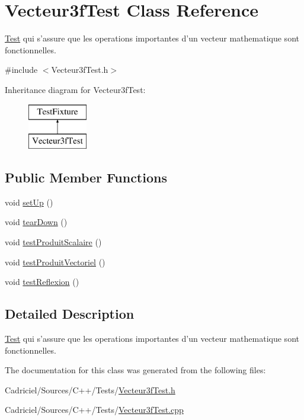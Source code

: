 \hypertarget{class_vecteur3f_test}{\section{Vecteur3f\-Test Class Reference}
\label{class_vecteur3f_test}
}


\hyperlink{class_test}{Test} qui s'assure que les operations importantes d'un vecteur mathematique sont fonctionnelles.  




{\ttfamily \#include $<$Vecteur3f\-Test.\-h$>$}

Inheritance diagram for Vecteur3f\-Test\-:\begin{figure}[H]
\begin{center}
\leavevmode
\includegraphics[height=2.000000cm]{class_vecteur3f_test}
\end{center}
\end{figure}
\subsection*{Public Member Functions}
\begin{DoxyCompactItemize}
\item 
void \hyperlink{group__inf2990_ga52555efbe6a00b29444796fff3f6c1b5}{set\-Up} ()
\item 
void \hyperlink{group__inf2990_gae61f241d05a67bad1fffd292c5ef51b6}{tear\-Down} ()
\item 
void \hyperlink{group__inf2990_gadad2a78f28a7c4791e7bd2d4bb5f3aa8}{test\-Produit\-Scalaire} ()
\item 
void \hyperlink{group__inf2990_ga7061edce110db669267d0d4122e30a50}{test\-Produit\-Vectoriel} ()
\item 
void \hyperlink{group__inf2990_ga56a44d73fe7e58291656778aa1defee9}{test\-Reflexion} ()
\end{DoxyCompactItemize}


\subsection{Detailed Description}
\hyperlink{class_test}{Test} qui s'assure que les operations importantes d'un vecteur mathematique sont fonctionnelles. 

The documentation for this class was generated from the following files\-:\begin{DoxyCompactItemize}
\item 
Cadriciel/\-Sources/\-C++/\-Tests/\hyperlink{_vecteur3f_test_8h}{Vecteur3f\-Test.\-h}\item 
Cadriciel/\-Sources/\-C++/\-Tests/\hyperlink{_vecteur3f_test_8cpp}{Vecteur3f\-Test.\-cpp}\end{DoxyCompactItemize}
